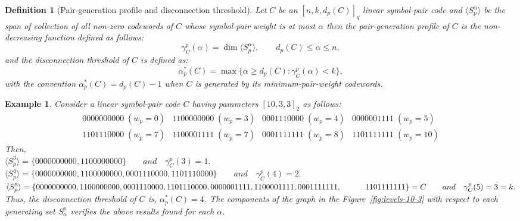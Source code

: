 \documentclass[11pt,draftclsnofoot,journal,onecolumn]{IEEEtran}
\newtheorem{definition}{Definition}
\newtheorem{example}{Example}
\begin{document}
    \begin{definition}[Pair-generation profile and disconnection threshold]
        Let \(C\) be an $[n, k, d_p(C)]_q$ linear symbol-pair code and $\langle S^\alpha_p\rangle$ be the span of collection of all non-zero codewords of $C$ whose symbol-pair weight is at most $\alpha$ then the pair-generation profile of $C$ is the non-decreasing function defined as follows:
        \[
            \gamma_C^p(\alpha)=\dim\langle S^\alpha_p\rangle, \qquad d_p(C)\le\alpha\le n,
        \]
        and the disconnection threshold of $C$ is defined as:
        \[
            \alpha_p^{*}(C)=\max\{\alpha\ge d_p(C):\gamma_C^p(\alpha)<k\},
        \]
        with the convention $\alpha_p^{*}(C)=d_p(C)-1$ when $C$ is generated by its minimum-pair-weight codewords.
    \end{definition}
    

    \begin{example}
    \label{exa:pair-gen-fun-and-gen-thres}
    Consider a linear symbol-pair code $C$ having parameters $[10, 3, 3]_2$ as follows:
    \[
    \begin{array}{llll}
    0000000000\;(w_p =0) & 1100000000\;(w_p = 3) & 0001110000\;(w_p = 4) & 0000001111\;(w_p = 5)\\
    1101110000\;(w_p =7) & 1100001111\;(w_p = 7) & 0001111111\;(w_p = 8) & 1101111111\;(w_p = 10)
    \end{array}
    \]
    Then, \\
    $\langle S^3_p \rangle = \{0000000000, 1100000000\} \qquad and \quad  \gamma_C^p(3)= 1.$\\    
    $\langle S_p^4 \rangle= \{ 0000000000, 1100000000, 0001110000, 1101110000\} \qquad and \quad  \gamma_C^p(4)= 2.$\\
    $\langle S_p^5 \rangle= \{ 0000000000, 1100000000, 0001110000, 1101110000, 0000001111, 1100001111,0001111111,\\ \qquad \quad  1101111111 \} = C \qquad and \quad  \gamma_C^p(5)= 3 = k.$\\
    Thus, the disconnection threshold of $C$ is, $\alpha_p^{*}(C) = 4$.
    The components of the graph in the Figure~\ref{fig:levels-10-3} with respect to each generating set $S_\alpha^p$ verifies the above results found for each $\alpha$. 
    \end{example}
\end{document}
